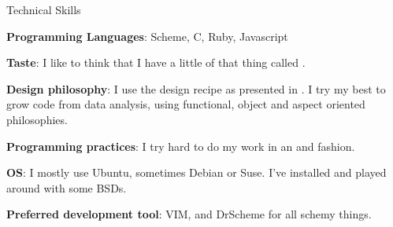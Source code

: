 \begin{rubric}{Technical Skills}{ 

    \entry* \textbf{Programming Languages}: Scheme, C, Ruby, Javascript

    \entry* \textbf{Taste}: I like to think that I have a little of that thing
    called .

    \entry* \textbf{Design philosophy}: I use the design recipe as presented in
    . I try my best to grow code
    from data analysis, using functional, object and aspect oriented
    philosophies. 

    \entry* \textbf{Programming practices}: I try hard to do my work in an
     and 
    fashion.

    \entry* \textbf{OS}: I mostly use Ubuntu, sometimes Debian or Suse. I've
    installed and played around with some BSDs.

    \entry* \textbf{Preferred development tool}: VIM, and DrScheme for all
    schemy things. 

}\end{rubric}
